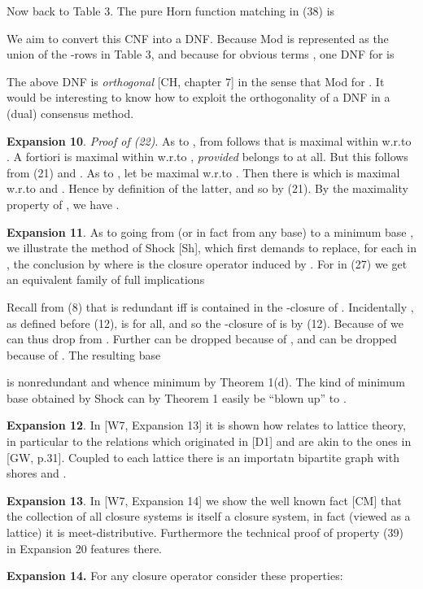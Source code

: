\documentclass[11pt]{article}
\begin{document}
Now back to Table 3. The pure Horn function matching  in (38) is

We aim to convert this CNF into a DNF. Because Mod is represented as the union of the -rows  in Table 3, and because  for obvious terms , one DNF for  is

The above DNF is {\it orthogonal} [CH, chapter 7] in the sense that Mod for . It would be interesting to know how to exploit the orthogonality of a DNF in a (dual) consensus method.



{\bf Expansion 10}. {\it Proof of (22)}. As to , from  follows that  is maximal within  w.r.to . A fortiori  is maximal within  w.r.to , {\it provided}  belongs to  at all. But this follows from (21) and . As to , let  be maximal w.r.to . Then there is  which is maximal w.r.to  and . Hence  by definition of the latter, and so  by (21). By the maximality property of , we have .



{\bf Expansion 11}. As to going from  (or in fact from any base) to a minimum base , we illustrate the method of Shock [Sh], which first demands to replace, for each  in , the conclusion  by  where  is the closure operator induced by . For  in (27) we get an equivalent family of full implications

Recall from (8) that  is redundant iff  is contained in the -closure of . Incidentally , as defined before (12), is  for all, and so the -closure of  is  by (12). Because of  we can thus drop  from . Further  can be dropped because of , and  can be dropped because of . The resulting base

is nonredundant and whence minimum by Theorem 1(d). The kind of minimum base  obtained by Shock can by Theorem 1 easily be ``blown up'' to .


{\bf Expansion 12}.  In [W7, Expansion 13] it is shown how  relates to lattice theory, in particular to the relations  which originated in [D1] and are akin to the ones in [GW, p.31]. Coupled to each lattice  there is an importatn bipartite graph with shores  and .


{\bf Expansion 13}.  In [W7, Expansion 14] we show the well known fact [CM] that the collection  of all closure systems  is itself a closure system, in fact (viewed as a lattice) it is meet-distributive. Furthermore the technical proof of property (39) in Expansion 20 features there.


{\bf Expansion 14.} For any closure operator  consider these properties:
\end{document}
